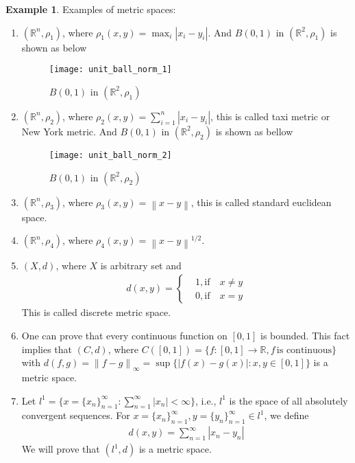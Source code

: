 \documentclass[12pt,leqno]{amsart}
\theoremstyle{definition}
\newtheorem{example}{Example}[section]
\numberwithin{equation}{subsection}
\begin{document}
\medskip

\begin{example}
Examples of metric spaces:
\begin{enumerate}
    \item $(\mathbb{R}^n,\rho_1)$, where $\rho_1(x,y) = \max_i |x_i-y_i|$. And $B(0,1)$ in $(\mathbb{R}^2,\rho_1)$ is shown as below\\
    \begin{figure}[h]
        \centering
        \texttt{[image: unit\_ball\_norm\_1]}
        \caption{$B(0,1)$ in $(\mathbb{R}^2,\rho_1)$}
        \label{fig:unit_ball_norm_1}
    \end{figure}
    \item $(\mathbb{R}^n,\rho_2)$, where $\rho_2(x,y) = \sum^n_{i=1} |x_i-y_i|$, this is called taxi metric or New York metric. And $B(0,1)$ in $(\mathbb{R}^2,\rho_2)$ is shown as bellow\\
    \begin{figure}[h]
        \centering
        \texttt{[image: unit\_ball\_norm\_2]}
        \caption{$B(0,1)$ in $(\mathbb{R}^2,\rho_2)$}
        \label{fig:unit_ball_norm_2}
    \end{figure}
    \item $(\mathbb{R}^n,\rho_3)$, where $\rho_3(x,y) = \left\|x-y\right\|$, this is called standard euclidean space.
    \item $(\mathbb{R}^n,\rho_4)$, where $\rho_4(x,y) = \left\|x-y\right\|^{1/2}$.
    \item $(X,d)$, where $X$ is arbitrary set and 
    \begin{align*}
        d(x,y) = \left\{
        \begin{aligned}
        & 1, \text{if} \quad x \neq y\\
        & 0, \text{if} \quad x = y
        \end{aligned}
        \right.
    \end{align*} 
    This is called discrete metric space.
    \item One can prove that every continuous function on $[0,1]$ is bounded. This fact implies that $(C,d)$, where $C([0,1]) = \{f:[0,1]\rightarrow \mathbb{R}, f \, \text{is continuous}\}$ with $d(f,g) = \left\|f-g\right\|_\infty = \sup \{|f(x) - g(x)|: x,y\in[0,1]\}$ is a metric space.
    \item Let $l^1 = \{x = \{x_n\}^\infty_{n=1}: \sum^\infty_{n=1}|x_n| < \infty\}$, i.e., $l^1$ is the space of all absolutely convergent sequences. For $x = \{x_n\}^\infty_{n=1}, y = \{y_n\}^\infty_{n=1} \in l^1$, we define 
    \begin{align*}
        d(x,y) = \sum^\infty_{n=1} |x_n - y_n|
    \end{align*}
    We will prove that $(l^1,d)$ is a metric space.
    

\end{enumerate}
\end{example}
\end{document}
